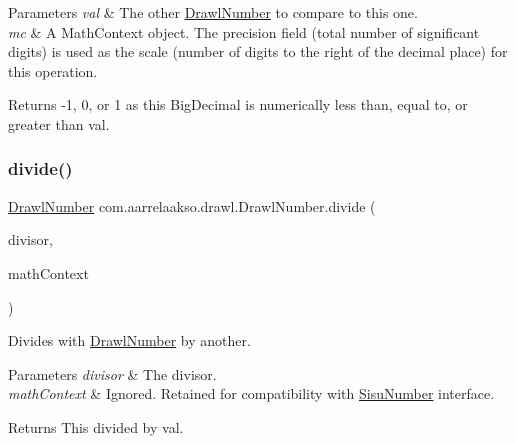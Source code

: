 \begin{DoxyParams}{Parameters}
{\em val} & The other \hyperlink{classcom_1_1aarrelaakso_1_1drawl_1_1_drawl_number}{Drawl\+Number} to compare to this one. \\
\hline
{\em mc} & A Math\+Context object. The precision field (total number of significant digits) is used as the scale (number of digits to the right of the decimal place) for this operation. \\
\hline
\end{DoxyParams}
\begin{DoxyReturn}{Returns}
-\/1, 0, or 1 as this Big\+Decimal is numerically less than, equal to, or greater than val. 
\end{DoxyReturn}
\mbox{\label{classcom_1_1aarrelaakso_1_1drawl_1_1_drawl_number_a42d9f576373ff039f2ee03ef9bb9d079}} 
\subsubsection{\texorpdfstring{divide()}{divide()}\hspace{0.1cm}{\footnotesize\ttfamily [1/3]}}
{\footnotesize\ttfamily \hyperlink{classcom_1_1aarrelaakso_1_1drawl_1_1_drawl_number}{Drawl\+Number} com.\+aarrelaakso.\+drawl.\+Drawl\+Number.\+divide (\begin{DoxyParamCaption}\item[{\hyperlink{classcom_1_1aarrelaakso_1_1drawl_1_1_drawl_number}{Drawl\+Number}}]{divisor,  }\item[{Math\+Context}]{math\+Context }\end{DoxyParamCaption})\hspace{0.3cm}{\ttfamily [protected]}}



Divides with \hyperlink{classcom_1_1aarrelaakso_1_1drawl_1_1_drawl_number}{Drawl\+Number} by another. 


\begin{DoxyParams}{Parameters}
{\em divisor} & The divisor. \\
\hline
{\em math\+Context} & Ignored. Retained for compatibility with \hyperlink{classcom_1_1aarrelaakso_1_1drawl_1_1_sisu_number}{Sisu\+Number} interface. \\
\hline
\end{DoxyParams}
\begin{DoxyReturn}{Returns}
This divided by val. 
\end{DoxyReturn}
\mbox{\label{classcom_1_1aarrelaakso_1_1drawl_1_1_drawl_number_ae3f1338acaa167edcc345c7be3a48aec}} 
